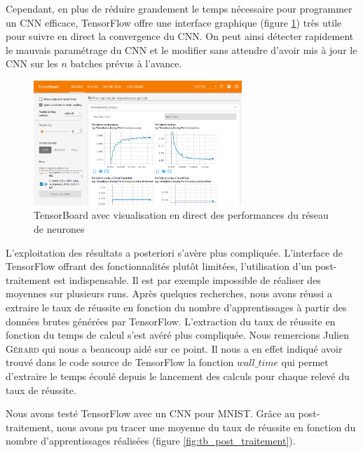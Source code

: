 Cependant, en plus de réduire grandement le temps nécessaire pour programmer un CNN efficace, TensorFlow offre une interface graphique (figure \ref{fig:interface_TF}) très utile pour suivre en direct la convergence du CNN. On peut ainsi détecter rapidement le mauvais paramétrage du CNN et le modifier sans attendre d'avoir mis à jour le CNN sur les $n$ batches prévus à l'avance.

\begin{figure}[h]
 \centering
 \includegraphics[width=0.7\textwidth]{img/interface_TF.png}
 \caption{TensorBoard avec visualisation en direct des performances du réseau de neurones}
 \label{fig:interface_TF}
\end{figure}


L'exploitation des résultats a posteriori s'avère plus compliquée. L'interface de TensorFlow offrant des fonctionnalités plutôt limitées, l'utilisation d'un post-traitement est indispensable. Il est par exemple impossible de réaliser des moyennes sur plusieurs runs. Après quelques recherches, nous avons réussi a extraire le taux de réussite en fonction du nombre d'apprentissages à partir des données brutes générées par TensorFlow. L'extraction du taux de réussite en fonction du temps de calcul s'est avéré plus compliquée. Nous remercions Julien \textsc{Gérard} qui nous a beaucoup aidé sur ce point. Il nous a en effet indiqué avoir trouvé dans le code source de TensorFlow la fonction $wall\_time$ qui permet d'extraire le temps écoulé depuis le lancement des calculs pour chaque relevé du taux de réussite.

Nous avons testé TensorFlow avec un CNN pour MNIST. Grâce au post-traitement, nous avons pu tracer une moyenne du taux de réussite en fonction du nombre d'apprentissages réalisées (figure \ref{fig:tb_post_traitement}).

